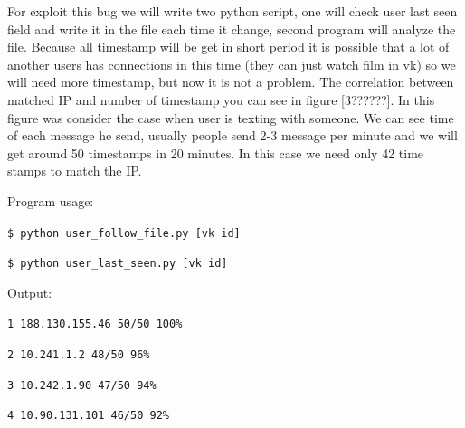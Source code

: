 For exploit this bug we will write two python script, one will check user last seen field and write it in the file each time it change, second program will analyze the file. Because all timestamp will be get in short period it is possible that a lot of another users has connections in this time (they can just watch film in vk) so we will need more timestamp, but now it is not a problem. The correlation between matched IP and number of timestamp you can see in figure [3??????]. In this figure was consider the case when user is texting with someone. We can see time of each message he send, usually people send 2-3 message per minute and we will get around 50 timestamps in 20 minutes. In this case we need only 42 time stamps to match the IP. 

Program usage:

\texttt{\$ python user{\_}follow{\_}file.py [vk id]}

\texttt{\$ python user{\_}last{\_}seen.py [vk id]}

Output:

\texttt{1 188.130.155.46 	50/50 100\%}

\texttt{2 10.241.1.2    	48/50 96\%}

\texttt{3 10.242.1.90   	47/50 94\%}

\texttt{4 10.90.131.101 	46/50 92\%}


\begin{figure} [H]
\end{figure}



